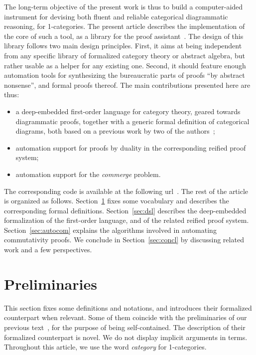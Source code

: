 The long-term objective of the present work is thus to build a computer-aided instrument for devising both fluent and reliable categorical diagrammatic reasoning, for 1-categories. The present article describes the implementation of the core of such a tool, as a library for the \Coq{} proof assistant~\cite{the_coq_development_team_2023_8161141}. The design of this library follows two main design principles. First, it aims at being independent from any specific library of formalized category theory or abstract algebra, but rather usable as a helper for any existing one. Second, it should feature enough automation tools for synthesizing the bureaucratic parts of proofs \enquote{by abstract nonsense}, and formal proofs thereof. The main contributions presented here are thus:
\begin{itemize}
  \item a deep-embedded first-order language for category theory, geared towards diagrammatic proofs, together with a generic formal definition of categorical diagrams, both based on a previous work by two of the authors~\cite{DBLP:conf/csl/MahboubiP24};
  \item automation support for proofs by duality in the corresponding reified proof system;
  \item automation support for the \emph{commerge} problem.
\end{itemize}
The corresponding code is available at the following url~\cite{repo}. The rest of the article is organized as follows. Section~\ref{sec:prelim} fixes some vocabulary and describes the corresponding formal definitions. Section~\ref{sec:dsl} describes the deep-embedded formalization of the first-order language, and of the related reified proof system. Section~\ref{sec:autocom} explains the algorithms involved in automating commutativity proofs. We conclude in Section~\ref{sec:concl} by discussing related work and a few perspectives.





\section{Preliminaries}\label{sec:prelim}

This section fixes some definitions and notations, and introduces their formalized counterpart when relevant. Some of them coincide with the preliminaries of our previous text~\cite{DBLP:conf/csl/MahboubiP24}, for the purpose of being self-contained. The description of their formalized counterpart is novel. We do not display implicit arguments in \Coq{} terms. Throughout this article, we use the word \emph{category} for 1-categories.

